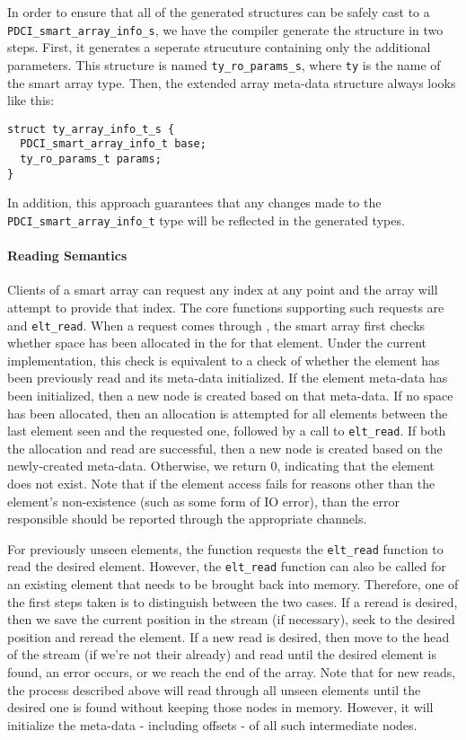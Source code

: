 \documentclass{article}
\begin{document}
In order to ensure that all of the generated structures can be safely
cast to a \verb|PDCI_smart_array_info_s|, we have the compiler
generate the structure in two steps. First, it generates a seperate
strucuture containing only the additional parameters. This structure
is named \verb|ty_ro_params_s|, where \verb|ty| is the name of the
smart array type. Then, the extended array meta-data structure always
looks like this:
\begin{verbatim}
struct ty_array_info_t_s {
  PDCI_smart_array_info_t base;
  ty_ro_params_t params;
}
\end{verbatim}
In addition, this approach guarantees that any changes made to the
\verb|PDCI_smart_array_info_t| type will be reflected in the generated
types.


\paragraph{Reading Semantics}
Clients of a smart array can request any index at any point and the
array will attempt to provide that index. The core functions
supporting such requests are \kc and \verb|elt_read|. When a request
comes through \kc, the smart array first checks whether space has been
allocated in the \emd for that element. Under the current
implementation, this check is equivalent to a check of whether the
element has been previously read and its meta-data initialized. If the
element meta-data has been initialized, then a new node is created
based on that meta-data. If no space has been allocated, then an
allocation is attempted for all elements between the last element seen
and the requested one, followed by a call to \verb|elt_read|. If both
the allocation and read are successful, then a new node is created
based on the newly-created meta-data. Otherwise, we return 0,
indicating that the element does not exist. Note that if the element
access fails for reasons other than the element's non-existence (such
as some form of IO error), than the error responsible should be
reported through the appropriate channels.

For previously unseen elements, the \kc function requests
the \verb|elt_read| function to read the desired element. However, the
\verb|elt_read| function can also be called for an existing element
that needs to be brought back into memory. Therefore, one of the first
steps taken is to distinguish between the two cases. If a reread is
desired, then we save the current position in the stream (if
necessary), seek to the desired position and reread the element. If a
new read is desired, then move to the head of the stream (if we're not
their already) and read until the desired element is found, an error
occurs, or we reach the end of the array. Note that for new reads,
the process described above will read through all unseen elements
until the desired one is found without keeping those nodes in
memory. However, it will initialize the meta-data - including offsets
- of all such intermediate nodes.
\end{document}
